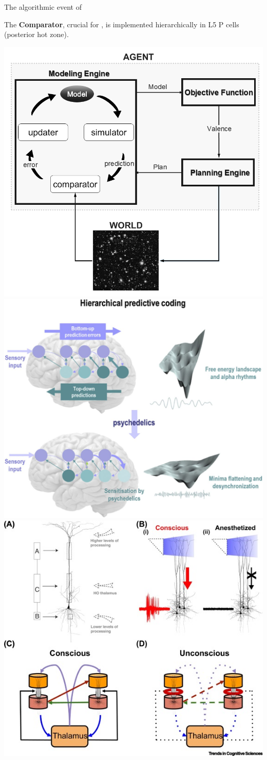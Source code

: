 \begin{frame}[label=ladila]{The algorithmic event of \SEP}

The \textbf{Comparator}, crucial for \SEP, is implemented hierarchically in L5 P cells\citep{CarhartHarris2019,Aru2020} (posterior hot zone). \vspace{0.5cm}

 
  \includegraphics[height=4.cm]{img/Figure1_StructuredDynamics.png}
\includegraphics[height=4.cm]{img/F1.large.jpg}
\includegraphics[height=4.cm]{img/gr2.jpeg}
\end{frame}




 
